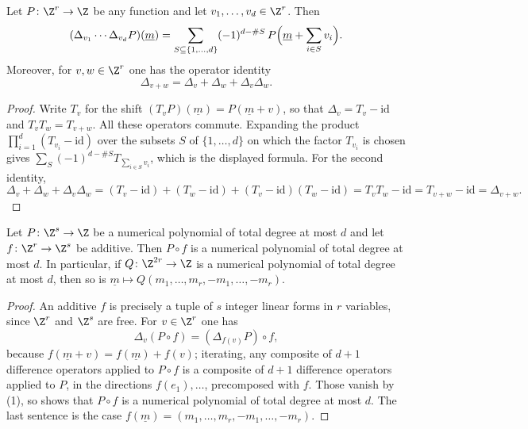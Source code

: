 \begin{lemma}
\label{lem:deg-difference-explicit}
Let $P\colon\Z^r\to\Z$ be any function and let $v_1,\dots,v_d\in\Z^r$.  Then
\[
  (\Delta_{v_1}\cdots\Delta_{v_d}P)(\underline m)
  =\sum_{S\subseteq\{1,\dots,d\}}(-1)^{d-\#S}\,
   P\Bigl(\underline m+\sum_{i\in S}v_i\Bigr).
\]
Moreover, for $v,w\in\Z^r$ one has the operator identity
\[
  \Delta_{v+w}=\Delta_v+\Delta_w+\Delta_v\Delta_w .
\]
\end{lemma}
\begin{proof}
Write $T_v$ for the shift $(T_vP)(\underline m)=P(\underline m+v)$, so that
$\Delta_v=T_v-\mathrm{id}$ and $T_vT_w=T_{v+w}$.  All these operators commute.
Expanding the product $\prod_{i=1}^d(T_{v_i}-\mathrm{id})$ over the subsets $S$
of $\{1,\dots,d\}$ on which the factor $T_{v_i}$ is chosen gives
$\sum_S(-1)^{d-\#S}T_{\sum_{i\in S}v_i}$, which is the displayed formula.  For
the second identity,
\[
  \Delta_v+\Delta_w+\Delta_v\Delta_w
  =(T_v-\mathrm{id})+(T_w-\mathrm{id})+(T_v-\mathrm{id})(T_w-\mathrm{id})
  =T_vT_w-\mathrm{id}=T_{v+w}-\mathrm{id}=\Delta_{v+w}.
\]
\end{proof}

\begin{lemma}
\label{lem:deg-numerical-substitution}
\leanok
Let $P\colon\Z^s\to\Z$ be a numerical polynomial of total degree at most $d$ and
let $f\colon\Z^r\to\Z^s$ be additive.  Then $P\circ f$ is a numerical polynomial
of total degree at most $d$.  In particular, if $Q\colon\Z^{2r}\to\Z$ is a
numerical polynomial of total degree at most $d$, then so is
$\underline m\mapsto Q(m_1,\dots,m_r,-m_1,\dots,-m_r)$.
\end{lemma}
\begin{proof}
\leanok
An additive $f$ is precisely a tuple of $s$ integer linear forms in $r$
variables, since $\Z^r$ and $\Z^s$ are free.  For $v\in\Z^r$ one has
\[
  \Delta_v(P\circ f)=(\Delta_{f(v)}P)\circ f ,
\]
because $f(\underline m+v)=f(\underline m)+f(v)$; iterating, any composite of
$d+1$ difference operators applied to $P\circ f$ is a composite of $d+1$
difference operators applied to $P$, in the directions $f(e_1),\dots$,
precomposed with $f$.  Those vanish by
(1), so
 shows that $P\circ f$ is a numerical
polynomial of total degree at most $d$.  The last sentence is the case
$f(\underline m)=(m_1,\dots,m_r,-m_1,\dots,-m_r)$.
\end{proof}

